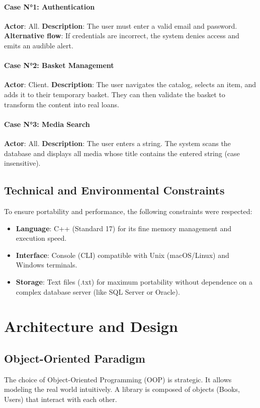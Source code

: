 \documentclass[12pt,a4paper]{report}
\begin{document}
\subsubsection{Case N°1: Authentication}
\textbf{Actor}: All.
\textbf{Description}: The user must enter a valid email and password.
\textbf{Alternative flow}: If credentials are incorrect, the system denies access and emits an audible alert.

\subsubsection{Case N°2: Basket Management}
\textbf{Actor}: Client.
\textbf{Description}: The user navigates the catalog, selects an item, and adds it to their temporary basket. They can then validate the basket to transform the content into real loans.

\subsubsection{Case N°3: Media Search}
\textbf{Actor}: All.
\textbf{Description}: The user enters a string. The system scans the database and displays all media whose title contains the entered string (case insensitive).

\section{Technical and Environmental Constraints}
To ensure portability and performance, the following constraints were respected:
\begin{itemize}
    \item \textbf{Language}: C++ (Standard 17) for its fine memory management and execution speed.
    \item \textbf{Interface}: Console (CLI) compatible with Unix (macOS/Linux) and Windows terminals.
    \item \textbf{Storage}: Text files (.txt) for maximum portability without dependence on a complex database server (like SQL Server or Oracle).
\end{itemize}

\chapter{Architecture and Design}

\section{Object-Oriented Paradigm}
The choice of Object-Oriented Programming (OOP) is strategic. It allows modeling the real world intuitively. A library is composed of objects (Books, Users) that interact with each other.
\end{document}
